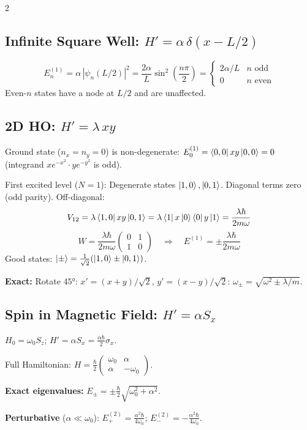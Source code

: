 \documentclass[9pt,a4paper]{article} %
\begin{document}
\begin{multicols}{2}
\subsection{Infinite Square Well: $H' = \alpha\,\delta(x - L/2)$}
\[
E_n^{(1)} = \alpha\,|\psi_n(L/2)|^2 = \frac{2\alpha}{L}\sin^2\!\left(\frac{n\pi}{2}\right)
= \begin{cases} 2\alpha/L & n\text{ odd} \\ 0 & n\text{ even}\end{cases}
\]
Even-$n$ states have a node at $L/2$ and are unaffected.

\subsection{2D HO: $H' = \lambda\, xy$}
Ground state ($n_x=n_y=0$) is non-degenerate: $E_0^{(1)} = \bra{0,0}xy\ket{0,0}=0$ (integrand $xe^{-x^2} \cdot y e^{-y^2}$ is odd).

First excited level ($N=1$): Degenerate states $\ket{1,0}, \ket{0,1}$.
Diagonal terms zero (odd parity). Off-diagonal:
\[
V_{12} = \lambda\bra{1,0}x y\ket{0,1} = \lambda\bra{1}x\ket{0}\bra{0}y\ket{1} = \frac{\lambda\hbar}{2m\omega}
\]
\[
W = \frac{\lambda\hbar}{2m\omega}\begin{pmatrix} 0 & 1 \\ 1 & 0 \end{pmatrix} \quad\Rightarrow\quad E^{(1)} = \pm\frac{\lambda\hbar}{2m\omega}
\]
Good states: $\ket{\pm} = \frac{1}{\sqrt{2}}(\ket{1,0} \pm \ket{0,1})$.

\textbf{Exact:} Rotate $45°$: $x' = (x+y)/\sqrt{2}$, $y' = (x-y)/\sqrt{2}$:
$\omega_\pm = \sqrt{\omega^2 \pm \lambda/m}$.

\subsection{Spin in Magnetic Field: $H' = \alpha S_x$}
$H_0 = \omega_0 S_z$;\; $H' = \alpha S_x = \frac{\alpha\hbar}{2}\sigma_x$.

Full Hamiltonian:
$H = \frac{\hbar}{2}\begin{pmatrix}\omega_0 & \alpha \\ \alpha & -\omega_0\end{pmatrix}$.

\textbf{Exact eigenvalues:}
$E_\pm = \pm\frac{\hbar}{2}\sqrt{\omega_0^2 + \alpha^2}$.

\textbf{Perturbative} ($\alpha \ll \omega_0$):
$E_+^{(2)} = \frac{\alpha^2\hbar}{4\omega_0}$;\;
$E_-^{(2)} = -\frac{\alpha^2\hbar}{4\omega_0}$.


\end{multicols}
\end{document}
